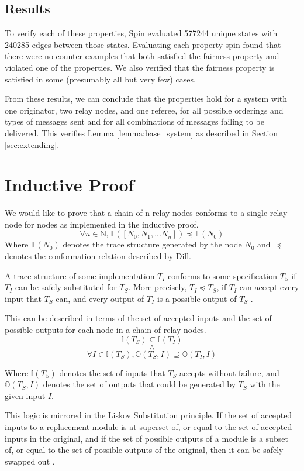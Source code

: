 \documentclass[runningheads]{llncs}
\newcommand{\inputset}[1]{\mathds{I}(#1)}
\newcommand{\outputset}[2]{\mathds{O}(#1, #2)}
\newcommand{\tracestruc}[1]{\mathds{T}(#1)}
\begin{document}
\subsection{Results}

To verify each of these properties, Spin evaluated 
577244 unique states with 240285 edges between those states. Evaluating each property spin found that there were no counter-examples that both satisfied the fairness property and violated one of the properties. We also verified that the fairness property is satisfied in some (presumably all but very few) cases. 

From these results, we can conclude that the properties hold for a system with one originator, two relay nodes, and one referee, for all possible orderings and types of messages sent and for all combinations of messages failing to be delivered. This verifies Lemma \ref{lemma:base_system} as described in Section \ref{sec:extending}.

\section{Inductive Proof} \label{chap:coq_results}
We would like to prove that a chain of n relay nodes conforms to a single relay node for nodes as implemented in the inductive proof.
$$\forall n \in \mathds{N}, \tracestruc{[N_0, N_1, ... N_n]} \preceq \tracestruc{N_0}
$$
Where $\tracestruc{N_0}$ denotes the trace structure generated by the node $N_0$ and $\preceq$ denotes the conformation relation described by Dill.

A trace structure of some implementation $T_I$ conforms to some specification $T_S$ if $T_I$ can be safely substituted for $T_S$. More precisely, $T_I \preceq T_S$, if $T_I$ can accept every input that $T_S$ can, and every output of $T_I$ is a possible output of $T_S$ \cite{uofu_conformance}.

This can be described in terms of the set of accepted inputs and the set of possible outputs for each node in a chain of relay nodes.
$$\inputset{T_S} \subseteq \inputset{T_I}$$
$$\wedge$$
$$ \forall I \in \inputset{T_S}, \outputset{T_S}{I} \supseteq \outputset{T_I}{I} $$

Where $\inputset{T_S}$ denotes the set of inputs that $T_S$ accepts without failure, and $\outputset{T_S}{I}$ denotes the set of outputs that could be generated by $T_S$ with the given input $I$.

This logic is mirrored in the Liskov Substitution principle. If the set of accepted inputs to a replacement module is at superset of, or equal to the set of accepted inputs in the original, and if the set of possible outputs of a module is a subset of, or equal to the set of possible outputs of the original, then it can be safely swapped out \cite{liskov_substitution}. 
\end{document}
